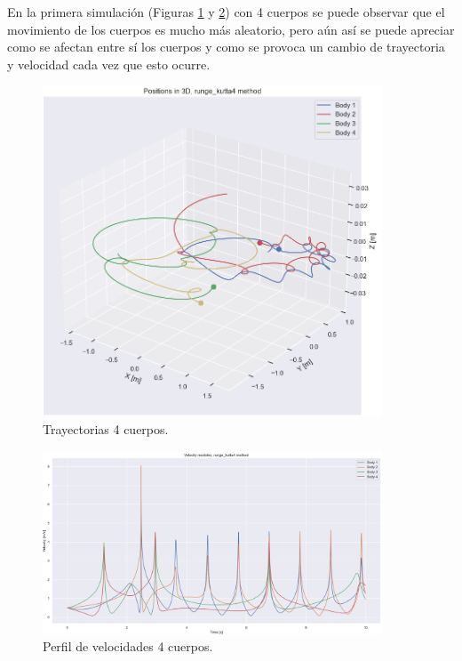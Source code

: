 \documentclass[12pt,a4paper]{article}
\begin{document}
En la primera simulación (Figuras \ref{4_body_3D} y \ref{4_body_vel}) con 4 cuerpos se puede observar que el movimiento de los cuerpos es mucho más aleatorio, pero aún así se puede apreciar como se afectan entre sí los cuerpos y como se provoca un cambio de trayectoria y velocidad cada vez que esto ocurre.
\begin{figure}[H]
	\centering
	\includegraphics[width=0.90\textwidth]{FIGURES/mil5/4nb_plot3D_1.png}
	\caption{Trayectorias 4 cuerpos.}
	\label{4_body_3D}
\end{figure}
\begin{figure}[H]
	\centering
	\includegraphics[width=0.90\textwidth]{FIGURES/mil5/4nb_vel_1.png}
	\caption{Perfil de velocidades 4 cuerpos.}
	\label{4_body_vel}
\end{figure}
\end{document}
